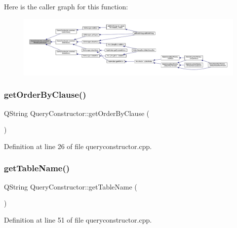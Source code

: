 Here is the caller graph for this function\+:
\nopagebreak
\begin{figure}[H]
\begin{center}
\leavevmode
\includegraphics[width=350pt]{classQueryConstructor_a7c864e227c2e76cc40a887314d43a0fe_icgraph}
\end{center}
\end{figure}
\hypertarget{classQueryConstructor_a1041679e9ba316cd61ddca2d0d73360d}{}\label{classQueryConstructor_a1041679e9ba316cd61ddca2d0d73360d} 
\subsubsection{\texorpdfstring{get\+Order\+By\+Clause()}{getOrderByClause()}}
{\footnotesize\ttfamily Q\+String Query\+Constructor\+::get\+Order\+By\+Clause (\begin{DoxyParamCaption}{ }\end{DoxyParamCaption})}



Definition at line 26 of file queryconstructor.\+cpp.

\hypertarget{classQueryConstructor_ab15e51c0e2017f03136de1e67d8ba97b}{}\label{classQueryConstructor_ab15e51c0e2017f03136de1e67d8ba97b} 
\subsubsection{\texorpdfstring{get\+Table\+Name()}{getTableName()}}
{\footnotesize\ttfamily Q\+String Query\+Constructor\+::get\+Table\+Name (\begin{DoxyParamCaption}{ }\end{DoxyParamCaption})}



Definition at line 51 of file queryconstructor.\+cpp.

